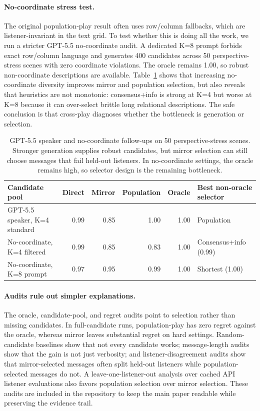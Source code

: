 \documentclass{article}
\begin{document}
\paragraph{No-coordinate stress test.}
The original population-play result often uses row/column fallbacks, which are listener-invariant in the text grid. To test whether this is doing all the work, we run a stricter GPT-5.5 no-coordinate audit. A dedicated K=8 prompt forbids exact row/column language and generates 400 candidates across 50 perspective-stress scenes with zero coordinate violations. The oracle remains 1.00, so robust non-coordinate descriptions are available. Table~\ref{tab:nocoord_summary} shows that increasing no-coordinate diversity improves mirror and population selection, but also reveals that heuristics are not monotonic: consensus+info is strong at K=4 but worse at K=8 because it can over-select brittle long relational descriptions. The safe conclusion is that cross-play diagnoses whether the bottleneck is generation or selection.

\begin{table}[t]
\centering
\small
\begin{tabular}{lrrrrl}
\toprule
Candidate pool & Direct & Mirror & Population & Oracle & Best non-oracle selector \\
\midrule
GPT-5.5 speaker, K=4 standard & 0.99 & 0.85 & 1.00 & 1.00 & Population \\
No-coordinate, K=4 filtered & 0.99 & 0.85 & 0.83 & 1.00 & Consensus+info (0.99) \\
No-coordinate, K=8 prompt & 0.97 & 0.95 & 0.99 & 1.00 & Shortest (1.00) \\
\bottomrule
\end{tabular}
\caption{GPT-5.5 speaker and no-coordinate follow-ups on 50 perspective-stress scenes. Stronger generation supplies robust candidates, but mirror selection can still choose messages that fail held-out listeners. In no-coordinate settings, the oracle remains high, so selector design is the remaining bottleneck.}
\label{tab:nocoord_summary}
\end{table}

\paragraph{Audits rule out simpler explanations.}
The oracle, candidate-pool, and regret audits point to selection rather than missing candidates. In full-candidate runs, population-play has zero regret against the oracle, whereas mirror leaves substantial regret on hard settings. Random-candidate baselines show that not every candidate works; message-length audits show that the gain is not just verbosity; and listener-disagreement audits show that mirror-selected messages often split held-out listeners while population-selected messages do not. A leave-one-listener-out analysis over cached API listener evaluations also favors population selection over mirror selection. These audits are included in the repository to keep the main paper readable while preserving the evidence trail.
\end{document}
